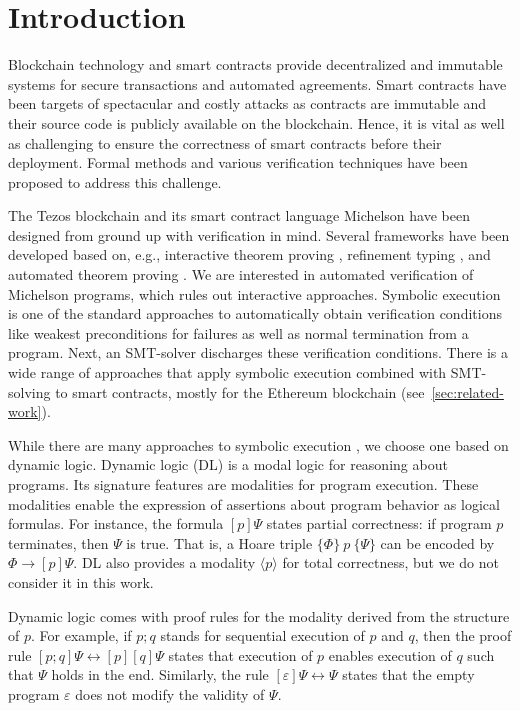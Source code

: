 \section{Introduction}
\label{sec:introduction}

Blockchain technology and smart contracts provide decentralized and
immutable systems for secure transactions and automated agreements.
Smart contracts have been targets of spectacular and costly attacks as
contracts are immutable and their source code is publicly available on
the blockchain. 
Hence, it is vital as well as challenging to ensure the correctness of smart contracts
before their deployment. Formal methods and various verification
techniques have been proposed to address this challenge.

The Tezos blockchain \cite{tezos-whitepaper} and its smart contract
language Michelson have been designed from ground up with verification
in mind. Several frameworks have been developed based on, e.g.,
interactive theorem proving \cite{micho}, refinement typing
\cite{helmholtz}, and automated theorem proving \cite{WHYtool}.  We
are interested in automated verification of Michelson programs, which
rules out interactive approaches.  Symbolic
execution~\cite{DBLP:journals/cacm/King76,DBLP:conf/ifip/Burstall74}
is one of the standard approaches to automatically obtain verification
conditions like weakest preconditions for failures as well as normal
termination from a program. Next, an SMT-solver discharges these
verification conditions. There is a wide range of approaches that
apply symbolic execution combined with SMT-solving to smart contracts,
mostly for the Ethereum blockchain (see~\autoref{sec:related-work}).

While there are many approaches to symbolic execution
\cite{DBLP:conf/osdi/CadarDE08,DBLP:conf/icse/CsallnerTS08,Pasareanu2020},
we choose one based on dynamic logic.
Dynamic logic (DL) \cite{DL} is a modal logic for reasoning about
programs. Its signature features are modalities for program
execution. These modalities enable the expression of assertions about
program behavior as logical formulas. For instance, the formula $[p]
\Psi$ states partial correctness: if program $p$ terminates, then $\Psi$ is true. That
is, a Hoare triple $\{\Phi\}~p~\{ \Psi\}$ can be
encoded by $\Phi \to [p]\Psi$. DL also provides a modality
$\langle p\rangle$ for total correctness, but we do not consider it in this work.

Dynamic logic comes with proof rules for the modality derived from the
structure of $p$. For example, if $p;q$ stands for sequential 
execution of $p$ and $q$, then the proof rule $[p;q]\Psi
\leftrightarrow [p][q]\Psi$ states that execution of $p$ enables
execution of $q$ such that $\Psi$ holds in the end. Similarly, the
rule $[\varepsilon]\Psi \leftrightarrow \Psi$ states that the empty
program $\varepsilon$ does not modify the validity of $\Psi$.


